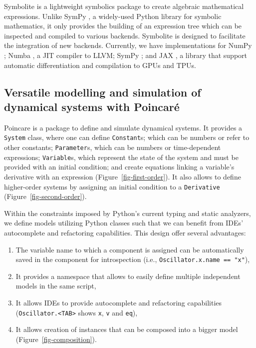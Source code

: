 \documentclass{article}
\providecommand{\tightlist}{%
  \setlength{\itemsep}{0pt}\setlength{\parskip}{0pt}}\usepackage{longtable,booktabs}
\begin{document}
Symbolite is a lightweight symbolics package to create algebraic mathematical expressions.
Unlike SymPy \cite{meurerSymPySymbolicComputing2017},
a widely-used Python library for symbolic mathematics,
it only provides the building of an expression tree
which can be inspected and compiled to various backends.
Symbolite is designed to facilitate the integration of new backends.
Currently, we have implementations for
NumPy \cite{harrisArrayProgrammingNumPy2020};
Numba \cite{lamNumbaLLVMbasedPython2015},
a \ac{JIT} compiler to LLVM;
SymPy \cite{meurerSymPySymbolicComputing2017};
and JAX \cite{jax2018github}, a
library that support automatic differentiation and compilation to \acp{GPU} and \acp{TPU}.

\hypertarget{versatile-modelling-and-simulation-of-dynamical-systems-with-poincaruxe9}{%
\subsection{Versatile modelling and simulation of dynamical systems with
Poincaré}\label{versatile-modelling-and-simulation-of-dynamical-systems-with-poincaruxe9}}



Poincare is a package to define and simulate dynamical systems.
It provides a \texttt{System} class,
where one can define
\texttt{Constant}s; which can be numbers or refer to other constants;
\texttt{Parameter}s, which can be numbers or time-dependent expressions;
\texttt{Variable}s, which represent the state of the system and must be provided with an initial condition;
and create equations linking a variable's derivative with an expression (Figure~\ref{fig-first-order}).
It also allows to define higher-order systems
by assigning an initial condition to a \texttt{Derivative} (Figure~\ref{fig-second-order}).

Within the constraints imposed by Python's current typing and static analyzers,
we define models utilizing Python classes
such that we can benefit from \acp{IDE}' autocomplete and refactoring capabilities.
This design offer several advantages:

\begin{enumerate}
\def\labelenumi{\arabic{enumi}.}
\tightlist
\item
  The variable name to which a component is assigned can be automatically saved in the component for introspection
  (i.e., \texttt{Oscillator.x.name\ ==\ "x"}),
\item
  It provides a namespace that allows to easily define multiple independent models in the same script,
\item
  It allows \acp{IDE} to provide autocomplete and refactoring capabilities
  (\texttt{Oscillator.\textless{}TAB\textgreater{}} shows \texttt{x}, \texttt{v} and \texttt{eq}),
\item
  It allows creation of instances that can be composed into a bigger model (Figure~\ref{fig-composition}).
\end{enumerate}
\end{document}
